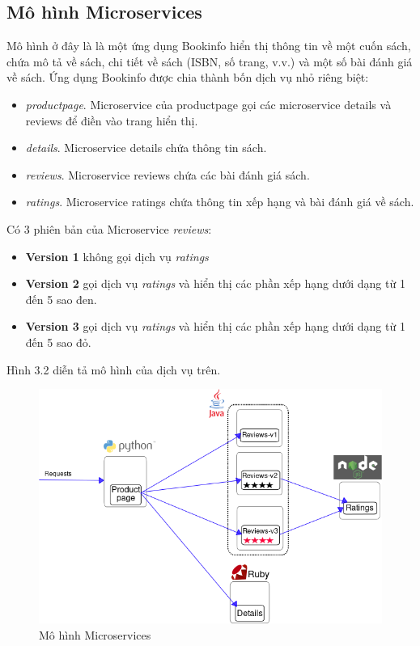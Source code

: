 \documentclass[12pt,a4paper]{report}
\begin{document}
{{	\subsection{Mô hình Microservices}
	Mô hình ở đây là là một ứng dụng Bookinfo hiển thị thông tin về một cuốn sách, chứa mô tả về sách, chi tiết về sách (ISBN, số trang, v.v.) và một số bài đánh giá về sách.
	Ứng dụng Bookinfo được chia thành bốn dịch vụ nhỏ riêng biệt:
	\begin{itemize}
		\item \textit{productpage}. Microservice của productpage gọi các microservice details và reviews để điền vào trang hiển thị.
		\item \textit{details}.  Microservice details chứa thông tin sách.
		\item \textit{reviews}. Microservice reviews chứa các bài đánh giá sách.
		\item \textit{ratings}. Microservice ratings chứa thông tin xếp hạng và bài đánh giá về sách.
	\end{itemize}
	
	Có 3 phiên bản của Microservice \textit{reviews}:
	\begin{itemize}
		\item \textbf{Version 1} không gọi dịch vụ \textit{ratings}
		\item \textbf{Version 2} gọi dịch vụ \textit{ratings} và hiển thị các phần xếp hạng dưới dạng từ 1 đến 5 sao đen.
		\item \textbf{Version 3} gọi dịch vụ \textit{ratings} và hiển thị các phần xếp hạng dưới dạng từ 1 đến 5 sao đỏ.
	\end{itemize}
	
	Hình 3.2 diễn tả mô hình của dịch vụ trên.
	\begin{figure}[h]
		\centering
		\includegraphics[width=0.7\linewidth]{Pics/3.1.2-1}
		\caption{Mô hình Microservices}
		\label{fig:3.1.2-1}
	\end{figure}
}}
\end{document}

